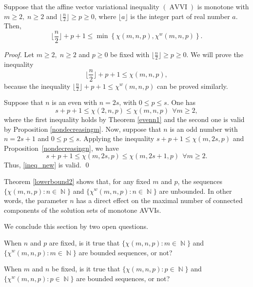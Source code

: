 \documentclass[smallextended,envcountsect]{svjour3}       %
\DeclareMathOperator{\AVVI}{AVVI}
\DeclareMathOperator{\N}{\mathbb{N}}
\begin{document}
\begin{theorem}\label{lowerbound2} Suppose that the affine vector variational inequality $(\AVVI)$ is monotone with $m\geq 2,\; n\geq 2$ and $\lfloor\frac{n}{2}\rfloor\geq p\geq 0$, where $\lfloor a \rfloor$ is the integer part of real number $a$. Then,
	$$\lfloor\frac{n}{2}\rfloor+p+1\leq \min\left\lbrace \chi(m,n,p), \chi^w(m,n,p)\right\rbrace.$$
\end{theorem}
\begin{proof} Let  $m\geq 2,\; n\geq 2$ and $p\geq 0$ be fixed with $\lfloor\frac{n}{2}\rfloor\geq p\geq 0$. We will prove the inequality \begin{equation}\label{ineq_new} \lfloor\frac{n}{2}\rfloor+p+1\leq  \chi(m,n,p),\end{equation} because the inequality $\lfloor\frac{n}{2}\rfloor+p+1\leq  \chi^w(m,n,p)$ can be proved similarly.

Suppose that $n$ is an even with $n=2s$, with $0 \leq p \leq s$. One has $$s+p+1\leq \chi(2,n,p)\leq \chi(m,n,p)\ \  \forall m\geq 2,$$ where the first inequality holds by Theorem \ref{evenn1} and the second one is valid by Proposition \ref{nondecreasingm}.
Now, suppose that $n$ is an odd number with $n=2s+1$ and $0 \leq p \leq s$. Applying the inequality $s+p+1\leq \chi(m,2s,p)$ and Proposition~\ref{nondecreasingn}, we have $$s+p+1\leq\chi(m,2s,p) \leq \chi(m,2s+1,p) \ \  \forall m\geq 2.$$ Thus, \eqref{ineq_new} is valid. \qed
\end{proof}
\begin{remark}
Theorem \ref{lowerbound2} shows that, for any fixed $m$ and $p$, the sequences $\{\chi(m,n,p):n\in \N\}$ and $\{\chi^w(m,n,p):n\in \N\}$ are unbounded. In other words, the parameter $n$ has a direct effect on the maximal number of connected components of the solution sets of monotone AVVIs.
\end{remark}

We conclude this section by two open questions.

\begin{question} When $n$ and $p$ are fixed,  is it true that $\{\chi(m,n,p):m\in \N\}$ and $\{\chi^w(m,n,p):m\in \N\}$ are bounded sequences, or not?
\end{question}
\begin{question}  When  $m$ and $n$ be fixed, is it true that  $\{\chi(m,n,p):p\in \N\}$ and $\{\chi^w(m,n,p):p\in \N\}$ are bounded sequences, or not?
\end{question}
\end{document}
